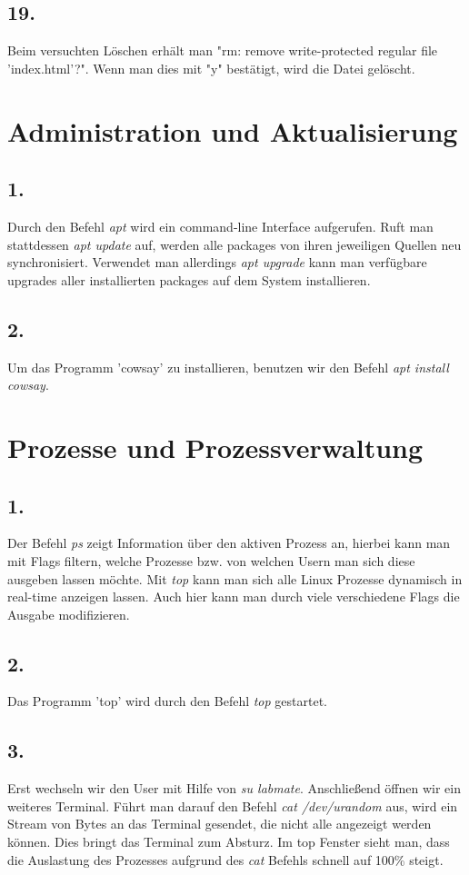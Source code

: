 \documentclass[
    fontsize=12pt,
    headings=small,
    parskip=half,           %
    bibliography=totoc,
    numbers=noenddot,       %
    open=any,               %
    ]{scrreprt}
\begin{document}
\subsection*{19.}
Beim versuchten Löschen erhält man "rm: remove write-protected regular file 'index.html'?". Wenn man dies mit "y" bestätigt, wird die Datei gelöscht.


\section{Administration und Aktualisierung}

\subsection*{1.}
Durch den Befehl \emph{apt} wird ein command-line Interface aufgerufen. Ruft man stattdessen \emph{apt update} auf, werden alle packages von ihren jeweiligen Quellen neu synchronisiert. Verwendet man allerdings \emph{apt upgrade} kann man verfügbare upgrades aller installierten packages auf dem System installieren. 

\subsection*{2.}
Um das Programm 'cowsay' zu installieren, benutzen wir den Befehl \emph{apt install cowsay}.

\section{Prozesse und Prozessverwaltung}

\subsection*{1.}
Der Befehl \emph{ps} zeigt Information über den aktiven Prozess an, hierbei kann man mit Flags filtern, welche Prozesse bzw. von welchen Usern man sich diese ausgeben lassen möchte. Mit \emph{top} kann man sich alle Linux Prozesse dynamisch in real-time anzeigen lassen. Auch hier kann man durch viele verschiedene Flags die Ausgabe modifizieren.

\subsection*{2.}
Das Programm 'top' wird durch den Befehl \emph{top} gestartet.

\subsection*{3.}
Erst wechseln wir den User mit Hilfe von \emph{su labmate}. Anschließend öffnen wir ein weiteres Terminal.
Führt man darauf den Befehl \emph{cat /dev/urandom} aus, wird ein Stream von Bytes an das Terminal gesendet, die nicht alle angezeigt werden können. Dies bringt das Terminal zum Absturz. Im top Fenster sieht man, dass die Auslastung des Prozesses aufgrund des \emph{cat} Befehls schnell auf 100\% steigt.
\end{document}
